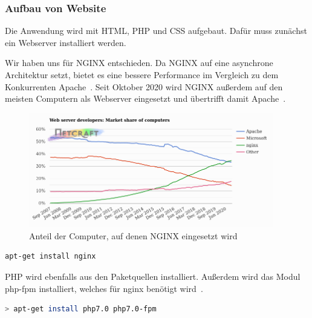 \subsubsection{Aufbau von Website}
Die Anwendung wird mit HTML, PHP und CSS aufgebaut.
Dafür muss zunächst ein Webserver installiert werden.


Wir haben uns für NGINX entschieden.
Da NGINX auf eine asynchrone Architektur setzt, bietet es eine bessere Performance im Vergleich zu dem Konkurrenten Apache~\cite{NginxVsApache}.
Seit Oktober 2020 wird NGINX außerdem auf den meisten Computern als Webserver eingesetzt und übertrifft damit Apache~\cite{WebServerSurvey}.

\begin{figure}[H]\centering
    \includegraphics[width=0.95\textwidth]{img/NGINX.png}
    \caption{Anteil der Computer, auf denen NGINX eingesetzt wird~\cite{WebServerSurvey}}\label{fig:figure}
\end{figure}

\begin{lstlisting}[language=Bash, caption=Installation von NGINX,label={lst:nginxinstall}]
apt-get install nginx
\end{lstlisting}
\vspace{5mm}


PHP wird ebenfalls aus den Paketquellen installiert.
Außerdem wird das Modul php-fpm installiert, welches für nginx benötigt wird~\cite{InstallNginxPHP}.

\begin{lstlisting}[language=Bash, caption=PHP und PHP-FPM installation,label={lst:installphpphpfpm}]
> apt-get install php7.0 php7.0-fpm
\end{lstlisting}
\vspace{5mm}


